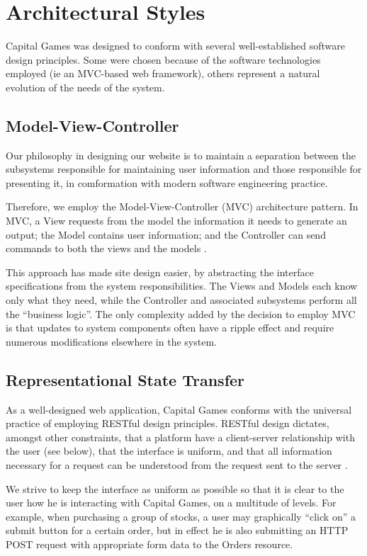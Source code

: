 \section{Architectural Styles}

Capital Games was designed to conform with several well-established
software design principles. 
Some were chosen because of the software technologies
employed (ie an MVC-based web framework), others 
represent a natural evolution of the needs of the 
system. 

\subsection{Model-View-Controller}

Our philosophy in designing our website is to maintain
a separation between the subsystems responsible for 
maintaining user information and those responsible
for presenting it, in comformation with modern software
engineering practice. 

Therefore, we employ the Model-View-Controller (MVC)
architecture pattern. In MVC, a View requests from the
model the information it needs to generate an output;
the Model contains user information; and the Controller
can send commands to both the views and the models \cite{wiki:mvc}. 

This approach has made site design easier,
by abstracting the interface specifications from the 
system responsibilities. The Views and Models each know 
only what they need, while the Controller and associated
subsystems perform all the ``business logic''. The only
complexity added by the decision to employ MVC is that
updates to system components often have a ripple effect
and require numerous modifications elsewhere in the system.

\subsection{Representational State Transfer}

As a well-designed web application, Capital Games 
conforms with the universal practice of employing
RESTful design principles. RESTful design dictates,
amongst other constraints, that a platform have a
client-server relationship with the user (see below),
that the interface is uniform, and that all information
necessary for a request can be understood from the
request sent to the server \cite{wiki:restful}. 

We strive to keep the interface as uniform as possible
so that it is clear to the user how he is interacting
with Capital Games, on a multitude of levels. For example,
when purchasing a group of stocks, a user may graphically
``click on'' a submit button for a certain order, but
in effect he is also submitting an HTTP POST request with
appropriate form data to the Orders resource. 

